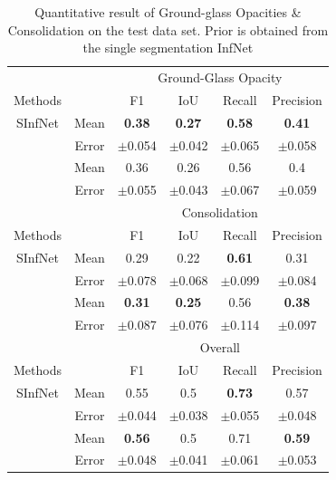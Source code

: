 \begin{table}[!h]
	\centering
	\small
	\begin{tabular}{| c | c ||  c c c c |}
		\hline
		& &\multicolumn{4}{c|}{Ground-Glass Opacity }\\ \cline{3-6}
		Methods & & F1 & IoU & Recall & Precision \\\hline
		SInfNet & Mean & \textbf{0.38} & \textbf{0.27} & \textbf{0.58} &\textbf{0.41}   \\ \cline{2-6}
		& Error & $\pm$0.054 & $\pm$0.042 & $\pm$0.065 & $\pm$0.058  \\ \hline
		\vtop{\hbox{\strut SSInfNet}\hbox{\strut }} & Mean & 0.36 & 0.26 & 0.56 & 0.4 \\ \cline{2-6}
		& Error &  $\pm$0.055 & $\pm$0.043 & $\pm$0.067 & $\pm$0.059 \\ \hline \hline
		
		& & \multicolumn{4}{c|}{Consolidation}\\ \cline{3-6}
		Methods & & F1 & IoU & Recall & Precision \\ \hline
		SInfNet & Mean & 0.29 & 0.22 & \textbf{0.61} & 0.31  \\ \cline{2-6}
		& Error & $\pm$0.078 & $\pm$0.068 & $\pm$0.099 & $\pm$0.084  \\ \hline \hline
		\vtop{\hbox{\strut SSInfNet}\hbox{\strut }} & Mean & \textbf{0.31} & \textbf{0.25} & 0.56 & \textbf{0.38} \\ \cline{2-6}
		& Error & $\pm$0.087 & $\pm$0.076 & $\pm$0.114 & $\pm$0.097 \\ \hline \hline \hline
		
		
		& &\multicolumn{4}{c|}{Overall}\\ \cline{3-6}
		Methods & & F1 & IoU & Recall & Precision \\\hline
		SInfNet & Mean & 0.55 & 0.5 & \textbf{0.73} & 0.57   \\ \cline{2-6}
		& Error & $\pm$0.044 & $\pm$0.038 & $\pm$0.055 & $\pm$0.048 \\ \hline
		\vtop{\hbox{\strut SSInfNet}\hbox{\strut }} & Mean & \textbf{0.56} & 0.5 & 0.71 & \textbf{0.59} \\ \cline{2-6}
		& Error & $\pm$0.048 & $\pm$0.041 & $\pm$0.061 & $\pm$0.053\\ \hline \hline
		
	\end{tabular}
	\caption{Quantitative result of Ground-glass Opacities \& Consolidation on the test data set. Prior is obtained from the single segmentation InfNet}
	\label{tab:multi-weakprior}
\end{table}

